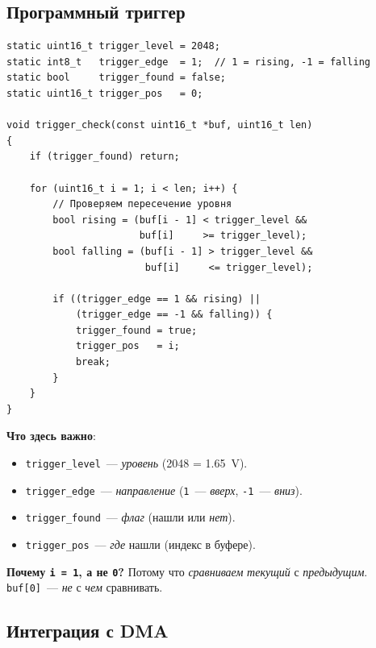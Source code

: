 \subsection{Программный триггер}

\begin{listing}[htbp]
\begin{verbatim}
static uint16_t trigger_level = 2048;
static int8_t   trigger_edge  = 1;  // 1 = rising, -1 = falling
static bool     trigger_found = false;
static uint16_t trigger_pos   = 0;

void trigger_check(const uint16_t *buf, uint16_t len)
{
    if (trigger_found) return;

    for (uint16_t i = 1; i < len; i++) {
        // Проверяем пересечение уровня
        bool rising = (buf[i - 1] < trigger_level &&
                       buf[i]     >= trigger_level);
        bool falling = (buf[i - 1] > trigger_level &&
                        buf[i]     <= trigger_level);

        if ((trigger_edge == 1 && rising) ||
            (trigger_edge == -1 && falling)) {
            trigger_found = true;
            trigger_pos   = i;
            break;
        }
    }
}
\end{verbatim}
\caption{\texttt{trigger\_check()}~--- программный триггер}
\label{lst:trigger-check}
\end{listing}

\textbf{Что здесь важно}:
\begin{itemize}
    \item \texttt{trigger\_level}~--- \emph{уровень}
          (\num{2048} = \SI{1.65}{\volt}).
    \item \texttt{trigger\_edge}~--- \emph{направление}
          (\texttt{1}~--- \emph{вверх}, \texttt{-1}~--- \emph{вниз}).
    \item \texttt{trigger\_found}~--- \emph{флаг} (нашли
          или \emph{нет}).
    \item \texttt{trigger\_pos}~--- \emph{где} нашли
          (индекс в буфере).
\end{itemize}

\begin{warnbox}
\textbf{Почему \texttt{i = 1}, а не \texttt{0}?} Потому
что \emph{сравниваем} \emph{текущий} с \emph{предыдущим}.
\texttt{buf[0]}~--- \emph{не} с \emph{чем} сравнивать.
\end{warnbox}

\subsection{Интеграция с DMA}

